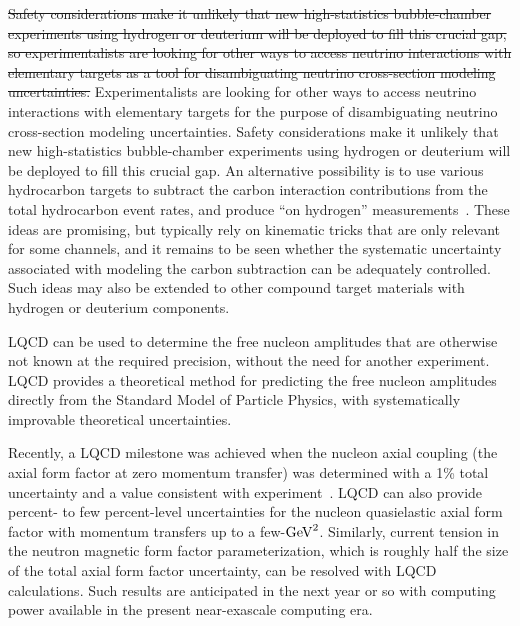 \documentclass{ar-1col}
\def\asm#1{{\color{blue}#1}}
\def\del#1{}
\def\done#1{{\color{brown}#1}}
\begin{document}
\sout{
Safety considerations make it unlikely that new high-statistics bubble-chamber experiments using
hydrogen or deuterium will be deployed to fill this crucial gap,
so experimentalists are looking for other ways to access neutrino interactions
with elementary targets as a tool for disambiguating neutrino cross-section modeling uncertainties.
}
\asm{Experimentalists are looking for other ways to access neutrino interactions
with elementary targets for the purpose of disambiguating neutrino cross-section
modeling uncertainties.
Safety considerations make it unlikely that new high-statistics bubble-chamber experiments using
hydrogen or deuterium will be deployed to fill this crucial gap.
}%
\del{One}\asm{An alternative} possibility is to use various hydrocarbon targets to subtract the carbon interaction contributions from
the total hydrocarbon event rates, and produce ``on hydrogen'' measurements~\cite{PhysRevD.92.051302, PhysRevD.101.092003, Hamacher-Baumann:2020ogq, DUNE:2021tad, Cai:2021vkc}.
These ideas are promising, but typically rely on kinematic tricks that are only relevant for some channels, and it remains to be seen whether the systematic uncertainty associated with modeling the carbon subtraction can be adequately controlled. Such ideas may also be extended to other compound target materials with hydrogen or deuterium components.

\del{In the absence of such an updated experiment,}
\done{LQCD can be used to determine the}
free nucleon amplitudes
that are otherwise not known at the required precision, \done{without the need for \del{an updated}\asm{another} experiment}.
LQCD provides a theoretical \done{method}\del{alternative}
for predicting the free nucleon amplitudes directly from the Standard Model of \asm{P}article \asm{P}hysics, with systematically improvable theoretical uncertainties.%
\begin{marginnote}
\end{marginnote}%
Recently, a \del{benchmark }LQCD \del{calculation}\asm{milestone} was achieved \del{in which}\asm{when} the nucleon axial \del{charge}\asm{coupling} (the axial form factor at zero momentum transfer) was determined with a 1\% total uncertainty \asm{and a value consistent with experiment}~\cite{Chang:2018uxx}.
LQCD can also provide percent\asm{-} to few percent\asm{-}level uncertainties for the nucleon quasielastic axial form factor with \asm{momentum transfers up to} a few-${\rm GeV}^2$\del{ reach in momentum transfer}.
Similarly, current tension in the neutron magnetic form factor parameterization, which is roughly half the size of the total axial form factor uncertainty, can be resolved with LQCD calculations.
Such results are anticipated in the next year or so with computing power available in the present near-exascale computing era.
\end{document}
